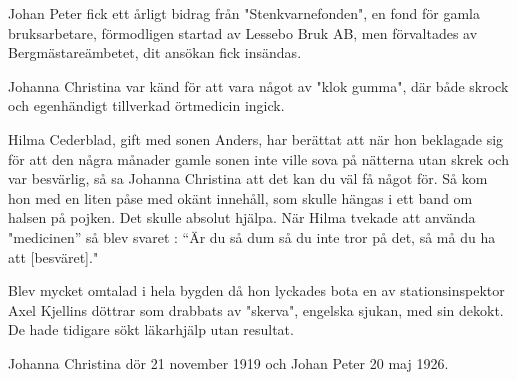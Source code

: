 Johan Peter fick ett årligt bidrag från "Stenkvarnefonden", en fond för gamla bruksarbetare, förmodligen startad av Lessebo Bruk AB, men förvaltades av Bergmästareämbetet, dit ansökan fick insändas.

Johanna Christina var känd för att vara något av "klok gumma", där både skrock och egenhändigt tillverkad örtmedicin ingick.

Hilma Cederblad, gift med sonen Anders, har berättat att när hon beklagade sig för att den några månader gamle sonen inte ville sova på nätterna utan skrek och var besvärlig, så sa Johanna Christina att det kan du väl få något för. Så kom hon med en liten påse med okänt innehåll, som skulle hängas i ett band om halsen på pojken. Det skulle absolut hjälpa. När Hilma tvekade att använda "medicinen'' så blev svaret : “Är du så dum så du inte tror på det, så må du ha att [besväret]."

Blev mycket omtalad i hela bygden då hon lyckades bota en av stationsinspektor Axel Kjellins döttrar som drabbats av "skerva", engelska sjukan, med sin dekokt. De hade tidigare sökt läkarhjälp utan resultat.

Johanna Christina dör 21 november 1919 och Johan Peter 20 maj 1926.

